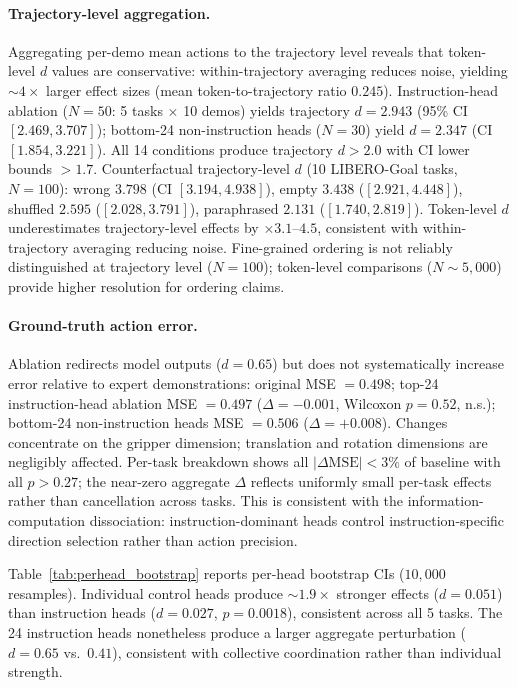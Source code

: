\paragraph{Trajectory-level aggregation.}
Aggregating per-demo mean actions to the trajectory level reveals that token-level $d$ values are conservative: within-trajectory averaging reduces noise, yielding ${\sim}4\times$ larger effect sizes (mean token-to-trajectory ratio $0.245$).
Instruction-head ablation ($N = 50$: 5 tasks $\times$ 10 demos) yields trajectory $d = 2.943$ (95\% CI $[2.469, 3.707]$); bottom-24 non-instruction heads ($N = 30$) yield $d = 2.347$ (CI $[1.854, 3.221]$).
All 14 conditions produce trajectory $d > 2.0$ with CI lower bounds $> 1.7$.
Counterfactual trajectory-level $d$ (10 LIBERO-Goal tasks, $N = 100$): wrong $3.798$ (CI $[3.194, 4.938]$), empty $3.438$ ($[2.921, 4.448]$), shuffled $2.595$ ($[2.028, 3.791]$), paraphrased $2.131$ ($[1.740, 2.819]$).
Token-level $d$ underestimates trajectory-level effects by ${\times}3.1$--$4.5$, consistent with within-trajectory averaging reducing noise.
Fine-grained ordering is not reliably distinguished at trajectory level ($N = 100$); token-level comparisons ($N {\sim} 5{,}000$) provide higher resolution for ordering claims.

\paragraph{Ground-truth action error.}
Ablation redirects model outputs ($d = 0.65$) but does not systematically increase error relative to expert demonstrations: original MSE $= 0.498$; top-24 instruction-head ablation MSE $= 0.497$ ($\Delta = -0.001$, Wilcoxon $p = 0.52$, n.s.); bottom-24 non-instruction heads MSE $= 0.506$ ($\Delta = +0.008$).
Changes concentrate on the gripper dimension; translation and rotation dimensions are negligibly affected.
Per-task breakdown shows all $|\Delta\text{MSE}| < 3\%$ of baseline with all $p > 0.27$; the near-zero aggregate $\Delta$ reflects uniformly small per-task effects rather than cancellation across tasks.
This is consistent with the information-computation dissociation: instruction-dominant heads control instruction-specific direction selection rather than action precision.

Table~\ref{tab:perhead_bootstrap} reports per-head bootstrap CIs ($10{,}000$ resamples).
Individual control heads produce ${\sim}1.9\times$ stronger effects ($d = 0.051$) than instruction heads ($d = 0.027$, $p = 0.0018$), consistent across all 5 tasks.
The 24 instruction heads nonetheless produce a larger aggregate perturbation ($d = 0.65$ vs.\ $0.41$), consistent with collective coordination rather than individual strength.

